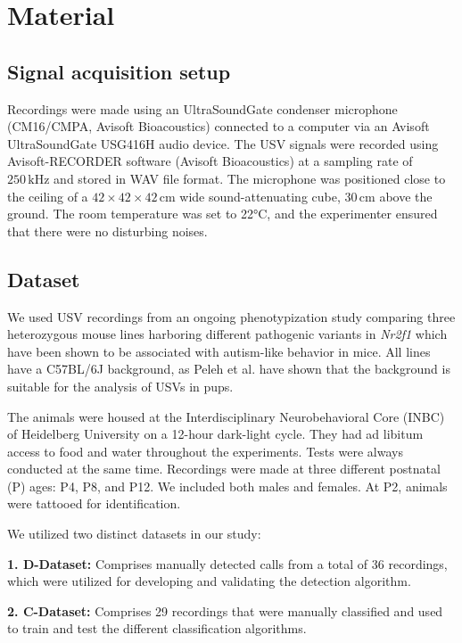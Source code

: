 \documentclass[preprint,NumberedRefs]{JASA}
\begin{document}
\section{Material}
\label{sec:Material}

\subsection{Signal acquisition setup}
\label{sec:Signal_acquisition_setup}

Recordings were made using an UltraSoundGate condenser microphone (CM16/CMPA, Avisoft Bioacoustics) connected to a computer via an Avisoft UltraSoundGate USG416H audio device. The USV signals were recorded using Avisoft-RECORDER software (Avisoft Bioacoustics) at a sampling rate of \(250\,\mathrm{kHz} \) and stored in WAV file format. The microphone was positioned close to the ceiling of a \(42 \times 42 \times 42\,\mathrm{cm}\) wide sound-attenuating cube, \(30\,\mathrm{cm} \) above the ground. The room temperature was set to 22°C, and the experimenter ensured that there were no disturbing noises.

\subsection{Dataset}
\label{sec:Dataset}

We used USV recordings from an ongoing phenotypization study comparing three heterozygous mouse lines harboring different pathogenic variants in \textit{Nr2f1} which have been shown to be associated with autism-like behavior in mice.  All lines have a C57BL/6J background, as Peleh et al. have shown that the background is suitable for the analysis of USVs in pups. \cite{Peleh2019-ic}

The animals were housed at the Interdisciplinary Neurobehavioral Core (INBC) of Heidelberg University on a 12-hour dark-light cycle. They had ad libitum access to food and water throughout the experiments. Tests were always conducted at the same time.
Recordings were made at three different postnatal (P) ages: P4, P8, and P12. We included both males and females. At P2, animals were tattooed for identification.

We utilized two distinct datasets in our study:

\textbf{1. D-Dataset:} Comprises manually detected calls from a total of 36 recordings, which were utilized for developing and validating the detection algorithm.

\textbf{2. C-Dataset:} Comprises 29 recordings that were manually classified and used to train and test the different classification algorithms.
\end{document}
